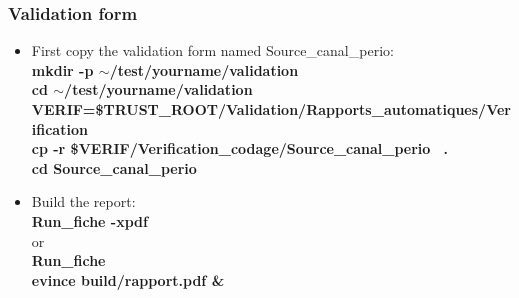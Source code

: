 \documentclass[10pt]{beamer}
\begin{document}
\begin{frame}
\frametitle{Validation form}
\begin{block}{}

\begin{itemize}
\item First copy the validation form named Source\_canal\_perio:\\
{\small{
\textbf{mkdir -p $\sim$/test/yourname/validation} \\
\textbf{cd  $\sim$/test/yourname/validation} \\
\textbf{VERIF=\$TRUST\_ROOT/Validation/Rapports\_automatiques/Verification} \\
\textbf{cp -r \$VERIF/Verification\_codage/Source\_canal\_perio \, .} \\
\textbf{cd Source\_canal\_perio}
 }}\\

\item Build the report:\\
\textbf{Run\_fiche -xpdf} \\
or\\
\textbf{Run\_fiche} \\
\textbf{evince build/rapport.pdf \&} 
\end{itemize}

\end{block}
\end{frame}
\end{document}
